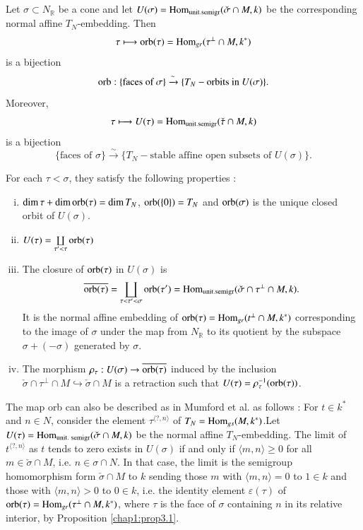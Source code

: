 \subsection{}\label{chap1:subsec5.5}%
Let $\sigma \subset N_{\mathbb{R}}$ be a cone and let
$U(\sigma) = \operatorname{Hom}_{\text{unit.semigr}} (\check{\sigma} \cap M, k)$ be the
corresponding normal affine $T_N$-embedding. Then 
$$
\tau \longmapsto \operatorname{orb}(\tau) =  \operatorname{Hom}_{gr} (\tau^{\perp} \cap
M, k^*) 
$$
 is a bijection
 $$
  \operatorname{orb}: \{ \text{faces of } \sigma \} \xrightarrow{\sim} \{ T_N-
  \text{orbits in } U(\sigma) \} .
 $$
  Moreover,
  $$
  \tau \longmapsto U(\tau) = \operatorname{Hom}_{\text{unit.semigr}} (\check{\tau} 
  \cap M, k) 
  $$
   is a bijection  
 $$
\{ \text{faces of } \sigma \} \xrightarrow{\sim} \{
T_N-\text{stable affine open subsets of } U(\sigma) \}.  
$$
   
\noindent
For each $\tau < \sigma$, they satisfy the following properties :  
\begin{enumerate}[(i)]
\item $\dim \tau + \dim \operatorname{orb} (\tau) = \dim T_N$, $\operatorname{orb} (\{ 0 \}) =
  T_N$ and $\operatorname{orb}(\sigma)$ is the unique closed orbit of $U(\sigma)$. 

\item $U(\tau) = \underset{\tau' < \tau }{\coprod} \operatorname{orb} (\tau)$

\item The closure of $\operatorname{orb} (\tau)$ in $U(\sigma)$ is
$$
\overline{\operatorname{orb} (\tau)} = \underset{\tau < \tau' < \sigma}{\coprod} \operatorname{orb} 
  (\tau')= \operatorname{Hom}_{\text{unit.semigr}} (\check{\sigma} \cap \tau^{\perp} \cap M,
k). 
$$
It is the normal affine embedding of $\operatorname{orb} (\tau)=\operatorname{Hom}_{gr} (t^{\perp}
\cap M, k^*)$ corresponding to the image of $\sigma$ under the map
from $N_{\mathbb{R}}$ to its quotient by the subspace $\sigma + (-
\sigma)$ generated by $\sigma$. 

\item The morphism $\rho_{\tau} : U(\sigma) \to \overline{\operatorname{orb}
  (\tau)}$ induced by the inclusion $\check{\sigma}\cap \tau^{\perp} \cap
  M \hookrightarrow \check{\sigma} \cap M$ is a retraction
  such that $U(\tau)= \rho_{\tau}^{-1}(\operatorname{orb}(\tau))$. 
\end{enumerate}

\begin{remark*}
The map orb can also be described as in Mumford et al. \cite{keyTE} as
follows : For $t \in k^*$ and $n \in N$, consider the element
$\tau^{\langle ?,  n \rangle}$ of $T_N =
\operatorname{Hom}_{gs}(M,k^*)$.\pageoriginale Let $U(\tau)= 
\operatorname{Hom}_{\text{unit. semigr}} (\check{\sigma}  \cap M, k)$ be the normal affine
$T_N$-embedding. The limit of  $t^{ \langle ?, n \rangle}$ as $t$ tends to zero
exists in $U(\sigma)$ if and only if $ \langle m,n \rangle \geq 0$ for all $m \in
\check{\sigma}  \cap M $, i.e. $n \in \sigma \cap N$. In that case,
the limit is the semigroup homomorphism form $\check{\sigma}  \cap M$
to $k$ sending those $m$ with $\langle m,n \rangle =0$ to $1 \in k$
and those with 
$\langle  m, n \rangle > 0$ to $0 \in k$, i.e. the identity element $\varepsilon
(\tau)$ of $\operatorname{orb}(\tau)= \operatorname{Hom}_{gr}(\tau^{\perp} \cap M, k^*)$, where
$\tau$ is the face of $\sigma$ containing $n$ in its relative
interior, by Proposition \ref{chap1:prop3.1}. 
\end{remark*}

